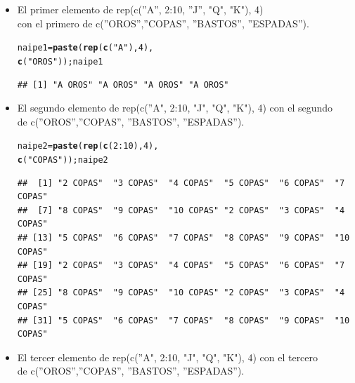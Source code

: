 \documentclass[12pt,letterpaper]{article}\usepackage[]{graphicx}\usepackage[]{color}
\makeatletter
\newcommand{\hlnum}[1]{\textcolor[rgb]{0.686,0.059,0.569}{#1}}%
\newcommand{\hlstr}[1]{\textcolor[rgb]{0.192,0.494,0.8}{#1}}%
\newcommand{\hlopt}[1]{\textcolor[rgb]{0,0,0}{#1}}%
\newcommand{\hlstd}[1]{\textcolor[rgb]{0.345,0.345,0.345}{#1}}%
\newcommand{\hlkwb}[1]{\textcolor[rgb]{0.69,0.353,0.396}{#1}}%
\newcommand{\hlkwd}[1]{\textcolor[rgb]{0.737,0.353,0.396}{\textbf{#1}}}%
\newenvironment{kframe}{%
 \def\at@end@of@kframe{}%
 \ifinner\ifhmode%
  \def\at@end@of@kframe{\end{minipage}}%
  \begin{minipage}{\columnwidth}%
 \fi\fi%
 \def\FrameCommand##1{\hskip\@totalleftmargin \hskip-\fboxsep
 \colorbox{shadecolor}{##1}\hskip-\fboxsep
     \hskip-\linewidth \hskip-\@totalleftmargin \hskip\columnwidth}%
 \MakeFramed {\advance\hsize-\width
   \@totalleftmargin\z@ \linewidth\hsize
   \@setminipage}}%
 {\par\unskip\endMakeFramed%
 \at@end@of@kframe}
\newenvironment{knitrout}{}{} %
\makeatother
\begin{document}
\begin{enumerate}
\begin{itemize}
\item El primer elemento de rep(c(''A'', 2:10, ''J'', "Q", "K"), 4)\\ 
con el primero de c(''OROS'',''COPAS'', ''BASTOS'', ''ESPADAS'').

\begin{knitrout}
\color{fgcolor}\begin{kframe}
\begin{alltt}
\hlstd{naipe1} \hlkwb{=} \hlkwd{paste}\hlstd{(}\hlkwd{rep}\hlstd{(}\hlkwd{c}\hlstd{(}\hlstr{"A"}\hlstd{),} \hlnum{4}\hlstd{),}
              \hlkwd{c}\hlstd{(}\hlstr{"OROS"}\hlstd{));naipe1}
\end{alltt}
\begin{verbatim}
## [1] "A OROS" "A OROS" "A OROS" "A OROS"
\end{verbatim}
\end{kframe}
\end{knitrout}

\item El segundo elemento de rep(c(''A", 2:10, "J", "Q", "K"), 4) con el segundo\\ 
de c(''OROS'',''COPAS'', ''BASTOS'', ''ESPADAS''). 

\begin{knitrout}
\color{fgcolor}\begin{kframe}
\begin{alltt}
\hlstd{naipe2} \hlkwb{=} \hlkwd{paste}\hlstd{(}\hlkwd{rep}\hlstd{(}\hlkwd{c}\hlstd{(} \hlnum{2}\hlopt{:}\hlnum{10}\hlstd{),} \hlnum{4}\hlstd{),}
              \hlkwd{c}\hlstd{(}\hlstr{"COPAS"}\hlstd{));naipe2}
\end{alltt}
\begin{verbatim}
##  [1] "2 COPAS"  "3 COPAS"  "4 COPAS"  "5 COPAS"  "6 COPAS"  "7 COPAS" 
##  [7] "8 COPAS"  "9 COPAS"  "10 COPAS" "2 COPAS"  "3 COPAS"  "4 COPAS" 
## [13] "5 COPAS"  "6 COPAS"  "7 COPAS"  "8 COPAS"  "9 COPAS"  "10 COPAS"
## [19] "2 COPAS"  "3 COPAS"  "4 COPAS"  "5 COPAS"  "6 COPAS"  "7 COPAS" 
## [25] "8 COPAS"  "9 COPAS"  "10 COPAS" "2 COPAS"  "3 COPAS"  "4 COPAS" 
## [31] "5 COPAS"  "6 COPAS"  "7 COPAS"  "8 COPAS"  "9 COPAS"  "10 COPAS"
\end{verbatim}
\end{kframe}
\end{knitrout}

\item El tercer elemento de rep(c(''A", 2:10, "J", "Q", "K"), 4) con el tercero\\ 
de c(''OROS'',''COPAS'', ''BASTOS'', ''ESPADAS''). 


\end{itemize}
\end{enumerate}
\end{document}
